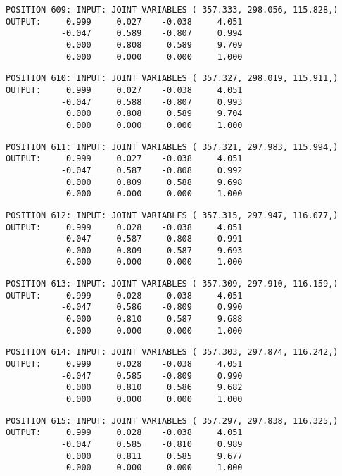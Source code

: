 \begin{verbatim}
POSITION 609: INPUT: JOINT VARIABLES ( 357.333, 298.056, 115.828,)
OUTPUT:     0.999     0.027    -0.038     4.051
           -0.047     0.589    -0.807     0.994
            0.000     0.808     0.589     9.709
            0.000     0.000     0.000     1.000
\end{verbatim} \pagebreak[1]\begin{verbatim}
POSITION 610: INPUT: JOINT VARIABLES ( 357.327, 298.019, 115.911,)
OUTPUT:     0.999     0.027    -0.038     4.051
           -0.047     0.588    -0.807     0.993
            0.000     0.808     0.589     9.704
            0.000     0.000     0.000     1.000
\end{verbatim} \pagebreak[1]\begin{verbatim}
POSITION 611: INPUT: JOINT VARIABLES ( 357.321, 297.983, 115.994,)
OUTPUT:     0.999     0.027    -0.038     4.051
           -0.047     0.587    -0.808     0.992
            0.000     0.809     0.588     9.698
            0.000     0.000     0.000     1.000
\end{verbatim} \pagebreak[1]\begin{verbatim}
POSITION 612: INPUT: JOINT VARIABLES ( 357.315, 297.947, 116.077,)
OUTPUT:     0.999     0.028    -0.038     4.051
           -0.047     0.587    -0.808     0.991
            0.000     0.809     0.587     9.693
            0.000     0.000     0.000     1.000
\end{verbatim} \pagebreak[1]\begin{verbatim}
POSITION 613: INPUT: JOINT VARIABLES ( 357.309, 297.910, 116.159,)
OUTPUT:     0.999     0.028    -0.038     4.051
           -0.047     0.586    -0.809     0.990
            0.000     0.810     0.587     9.688
            0.000     0.000     0.000     1.000
\end{verbatim} \pagebreak[1]\begin{verbatim}
POSITION 614: INPUT: JOINT VARIABLES ( 357.303, 297.874, 116.242,)
OUTPUT:     0.999     0.028    -0.038     4.051
           -0.047     0.585    -0.809     0.990
            0.000     0.810     0.586     9.682
            0.000     0.000     0.000     1.000
\end{verbatim} \pagebreak[1]\begin{verbatim}
POSITION 615: INPUT: JOINT VARIABLES ( 357.297, 297.838, 116.325,)
OUTPUT:     0.999     0.028    -0.038     4.051
           -0.047     0.585    -0.810     0.989
            0.000     0.811     0.585     9.677
            0.000     0.000     0.000     1.000
\end{verbatim} \pagebreak[1]\begin{verbatim}

\end{verbatim}

